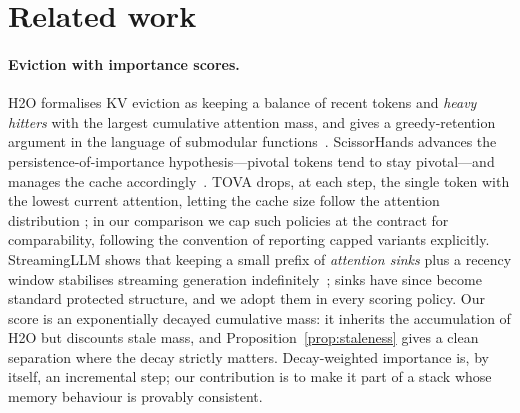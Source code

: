 \section{Related work}\label{sec:related}

\paragraph{Eviction with importance scores.}
H2O formalises KV eviction as keeping a balance of recent tokens and
\emph{heavy hitters} with the largest cumulative attention mass, and gives
a greedy-retention argument in the language of submodular
functions~\cite{zhang2023h2o}. ScissorHands advances the
persistence-of-importance hypothesis---pivotal tokens tend to stay
pivotal---and manages the cache accordingly~\cite{liu2023scissorhands}.
TOVA drops, at each step, the single token with the lowest current
attention, letting the cache size follow the attention distribution
\cite{oren2024tova}; in our comparison we cap such policies at the
contract for comparability, following the convention of reporting capped
variants explicitly. StreamingLLM shows that keeping a small prefix of
\emph{attention sinks} plus a recency window stabilises streaming
generation indefinitely~\cite{xiao2024streamingllm}; sinks have since
become standard protected structure, and we adopt them in every scoring
policy. Our \acs{} score is an exponentially decayed cumulative mass: it
inherits the accumulation of H2O but discounts stale mass, and
Proposition~\ref{prop:staleness} gives a clean separation where the
decay strictly matters. Decay-weighted importance is, by itself, an
incremental step; our contribution is to make it part of a stack whose
memory behaviour is provably consistent.

